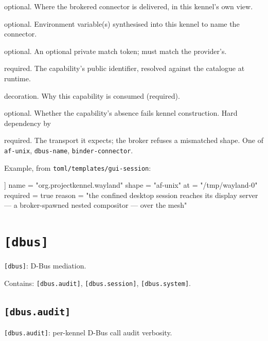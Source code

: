 \begin{description}
\tightlist
\item[\texttt{at}]
optional. Where the brokered connector is delivered, in this kennel's
own view.
\item[\texttt{env}]
optional. Environment variable(s) synthesised into this kennel to name
the connector.
\item[\texttt{key}]
optional. An optional private match token; must match the provider's.
\item[\texttt{name}]
required. The capability's public identifier, resolved against the
catalogue at runtime.
\item[\texttt{reason}]
decoration. Why this capability is consumed (required).
\item[\texttt{required}]
optional. Whether the capability's absence fails kennel construction.
Hard dependency by
\item[\texttt{shape}]
required. The transport it expects; the broker refuses a mismatched
shape. One of \texttt{af-unix}, \texttt{dbus-name},
\texttt{binder-connector}.
\end{description}

Example, from \texttt{toml/templates/gui-session}:

\begin{kennelcode}
[[consumes]]
name = "org.projectkennel.wayland"
shape = "af-unix"
at = "/tmp/wayland-0"
required = true
reason = "the confined desktop session reaches its display server — a broker-spawned nested compositor — over the mesh"
\end{kennelcode}

\hypertarget{dbus}{%
\section{\texorpdfstring{\texttt{{[}dbus{]}}}{{[}dbus{]}}}\label{dbus}}

\texttt{{[}dbus{]}}: D-Bus mediation.

Contains: \texttt{{[}dbus.audit{]}}, \texttt{{[}dbus.session{]}},
\texttt{{[}dbus.system{]}}.

\hypertarget{dbus.audit}{%
\subsection{\texorpdfstring{\texttt{{[}dbus.audit{]}}}{{[}dbus.audit{]}}}\label{dbus.audit}}

\texttt{{[}dbus.audit{]}}: per-kennel D-Bus call audit verbosity.

